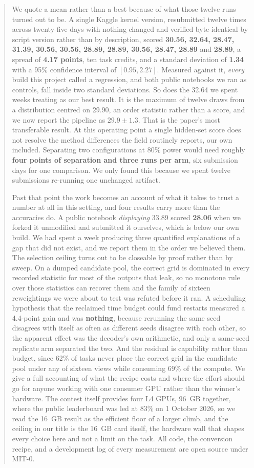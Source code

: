 \documentclass[11pt]{article}
\begin{document}
\begin{abstract}
We quote a mean rather than a best because of what those twelve runs turned out to be. A single
Kaggle kernel version, resubmitted twelve times across twenty-five days with nothing changed and verified
byte-identical by script version rather than by description, scored \textbf{30.56, 32.64, 28.47,
31.39, 30.56, 30.56, 28.89, 28.89, 30.56, 28.47, 28.89} and \textbf{28.89}, a spread of \textbf{4.17
points}, ten task credits, and a standard deviation of \textbf{1.34} with a 95\% confidence interval of
$[0.95, 2.27]$. Measured
against it, \emph{every} build this project called a regression, and both public notebooks we ran as
controls, fall inside two standard deviations. So does the 32.64 we spent weeks treating as our best
result. It is the maximum of twelve draws from a distribution centred on 29.90, an order statistic
rather than a score, and we now report the pipeline as $29.9 \pm 1.3$. That is the paper's most
transferable result. At this operating point a single hidden-set score does not resolve the method
differences the field routinely reports, our own included. Separating two configurations at 80\%
power would need roughly \textbf{four points of separation and three runs per arm}, six submission
days for one comparison. We only found this because we spent twelve submissions re-running one
unchanged artifact.

Past that point the work becomes an account of what it takes to trust a number at all in this setting,
and four results carry more than the accuracies do. A public notebook \emph{displaying} 33.89 scored
\textbf{28.06} when we forked it unmodified and submitted it ourselves, which is below our own build.
We had spent a week producing three quantified explanations of a gap that did not exist, and we report
them in the order we believed them. The selection ceiling turns out to be closeable by proof rather
than by sweep. On a dumped candidate pool, the correct grid is dominated in every recorded statistic
for most of the outputs that leak, so no monotone rule over those statistics can recover them and the
family of sixteen reweightings we were about to test was refuted before it ran. A scheduling
hypothesis that the reclaimed time budget could fund restarts measured a 4.4-point gain and was
\textbf{nothing}, because rerunning the same seed disagrees with itself as often as different seeds disagree
with each other, so the apparent effect was the decoder's own arithmetic, and only a same-seed
replicate arm separated the two. And the residual is capability rather than budget, since 62\% of tasks
never place the correct grid in the candidate pool under any of sixteen views while consuming 69\% of
the compute. We give a full accounting of
what the recipe costs and where the effort should go for anyone working with one consumer GPU rather
than the winner's hardware. The contest itself provides four L4 GPUs, 96~GB together, where the
public leaderboard was led at 83\% on 1 October 2026, so we read the 16~GB
result as the efficient floor of a larger climb, and the ceiling in our title is the 16~GB card itself, the hardware wall that shapes every choice here and not a limit on the task. All code, the
conversion recipe, and a development log of every measurement are open source under MIT-0.
\end{abstract}
\end{document}
